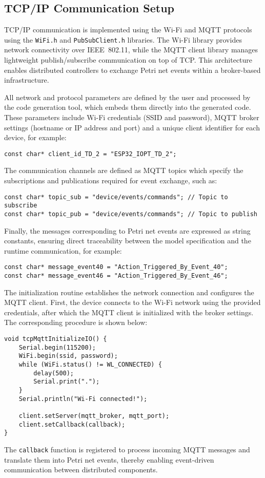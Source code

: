 \subsection{TCP/IP Communication Setup}
TCP/IP communication is implemented using the Wi-Fi and MQTT protocols using the \texttt{WiFi.h} and \texttt{PubSubClient.h} libraries. The Wi-Fi library provides network connectivity over IEEE~802.11, while the MQTT client library manages lightweight publish/subscribe communication on top of TCP. This architecture enables distributed controllers to exchange Petri net events within a broker-based infrastructure.

All network and protocol parameters are defined by the user and processed by the code generation tool, which embeds them directly into the generated code. These parameters include Wi-Fi credentials (SSID and password), MQTT broker settings (hostname or IP address and port) and a unique client identifier for each device, for example:
\begin{verbatim}
const char* client_id_TD_2 = "ESP32_IOPT_TD_2";
\end{verbatim}
The communication channels are defined as MQTT topics which specify the subscriptions and publications required for event exchange, such as:
\begin{verbatim}
const char* topic_sub = "device/events/commands"; // Topic to subscribe
const char* topic_pub = "device/events/commands"; // Topic to publish
\end{verbatim}
Finally, the messages corresponding to Petri net events are expressed as string constants, ensuring direct traceability between the model specification and the runtime communication, for example:
\begin{verbatim}
const char* message_event40 = "Action_Triggered_By_Event_40";
const char* message_event46 = "Action_Triggered_By_Event_46";
\end{verbatim}

The initialization routine establishes the network connection and configures the MQTT client. First, the device connects to the Wi-Fi network using the provided credentials, after which the MQTT client is initialized with the broker settings. The corresponding procedure is shown below:
\begin{verbatim}
void tcpMqttInitializeIO() {
    Serial.begin(115200);
    WiFi.begin(ssid, password);
    while (WiFi.status() != WL_CONNECTED) {
        delay(500);
        Serial.print(".");
    }
    Serial.println("Wi-Fi connected!");

    client.setServer(mqtt_broker, mqtt_port);
    client.setCallback(callback);
}
\end{verbatim}
The \texttt{callback} function is registered to process incoming MQTT messages and translate them into Petri net events, thereby enabling event-driven communication between distributed components.



